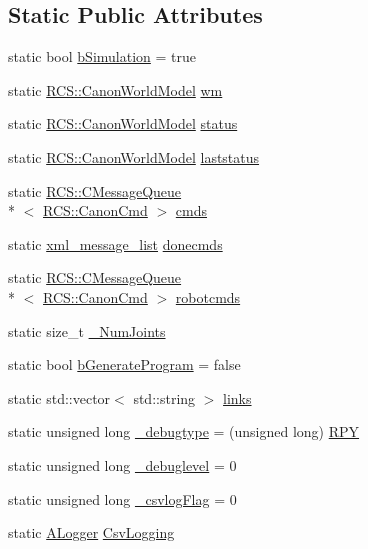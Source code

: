 \subsection*{Static Public Attributes}
\begin{DoxyCompactItemize}
\item 
static bool \hyperlink{structRCS_1_1CController_a5cc727cd1f880d16be6f34d501e06ef0}{b\-Simulation} = true
\item 
static \hyperlink{structRCS_1_1CanonWorldModel}{R\-C\-S\-::\-Canon\-World\-Model} \hyperlink{structRCS_1_1CController_a2b5d355e3e9d6195943ab148c1f94083}{wm}
\item 
static \hyperlink{structRCS_1_1CanonWorldModel}{R\-C\-S\-::\-Canon\-World\-Model} \hyperlink{structRCS_1_1CController_a82e9cc233cd25554964efe8a9008e0b2}{status}
\item 
static \hyperlink{structRCS_1_1CanonWorldModel}{R\-C\-S\-::\-Canon\-World\-Model} \hyperlink{structRCS_1_1CController_af76ac9412dbefbaebc970d62f88a40fa}{laststatus}
\item 
static \hyperlink{classRCS_1_1CMessageQueue}{R\-C\-S\-::\-C\-Message\-Queue}\\*
$<$ \hyperlink{structRCS_1_1CanonCmd}{R\-C\-S\-::\-Canon\-Cmd} $>$ \hyperlink{structRCS_1_1CController_adceba05ebd7fa94f93c131db84840d29}{cmds}
\item 
static \hyperlink{structRCS_1_1CController_aeaee07d36d39b56ecad1ce2443b5b4c0}{xml\-\_\-message\-\_\-list} \hyperlink{structRCS_1_1CController_a093ccebe77526dc736b0ddff70dec0fc}{donecmds}
\item 
static \hyperlink{classRCS_1_1CMessageQueue}{R\-C\-S\-::\-C\-Message\-Queue}\\*
$<$ \hyperlink{structRCS_1_1CanonCmd}{R\-C\-S\-::\-Canon\-Cmd} $>$ \hyperlink{structRCS_1_1CController_aa96c7961737b7e1cf5d8b4180f4bc399}{robotcmds}
\item 
static size\-\_\-t \hyperlink{structRCS_1_1CController_a9b155c29a4fbb8b1a36dada1417126ff}{\-\_\-\-Num\-Joints}
\item 
static bool \hyperlink{structRCS_1_1CController_a5b5e83348fbf18e362a59a2d96668466}{b\-Generate\-Program} = false
\item 
static std\-::vector$<$ std\-::string $>$ \hyperlink{structRCS_1_1CController_aa285781e418931357634dff5ef79a678}{links}
\item 
static unsigned long \hyperlink{structRCS_1_1CController_ae4ff5cead0f30ebf8dcbc850b342afc4}{\-\_\-debugtype} = (unsigned long) \hyperlink{structRCS_1_1CController_ae1f342838100497b0b94108c6ec74915aa62b453d8d0e2b7bf2f8a22b9b650441}{R\-P\-Y}
\item 
static unsigned long \hyperlink{structRCS_1_1CController_a1e7f92c361c961fae03b08986bc19a16}{\-\_\-debuglevel} = 0
\item 
static unsigned long \hyperlink{structRCS_1_1CController_ab52a91aa3bfa1f56b527217f09c66912}{\-\_\-csvlog\-Flag} = 0
\item 
static \hyperlink{classALogger}{A\-Logger} \hyperlink{structRCS_1_1CController_a7e21b1156fe37407bae1ba468815206c}{Csv\-Logging}
\end{DoxyCompactItemize}
